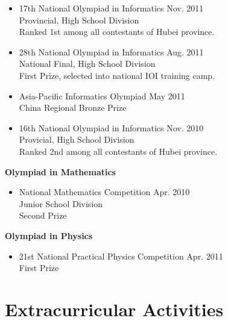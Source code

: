 \documentclass[margin]{res}
\begin{document}
\begin{resume}
\begin{itemize}
    \item{17th National Olympiad in Informatics \hfill Nov. 2011 \\
         Provincial, High School Division \\
         Ranked 1st among all contestants of Hubei province. }
    \item{28th National Olympiad in Informatics \hfill Aug. 2011 \\
         National Final, High School Division \\ 
         First Prize, selected into national IOI training camp. }
    \item{Asia-Pacific Informatics Olympiad \hfill May 2011 \\
         China Regional Bronze Prize}
    \item{16th National Olympiad in Informatics \hfill Nov. 2010 \\
         Provicial, High School Division \\
         Ranked 2nd among all contestants of Hubei province. }
\end{itemize}

{\bf Olympiad in Mathematics}

\begin{itemize}
    \item{National Mathematics Competition \hfill Apr. 2010 \\
         Junior School Division \\
         Second Prize}
\end{itemize}

{\bf Olympiad in Physics}

\begin{itemize}
    \item{21st National Practical Physics Competition \hfill Apr. 2011 \\
         First Prize} 
\end{itemize}

\section{Extracurricular Activities}


\end{resume}
\end{document}
